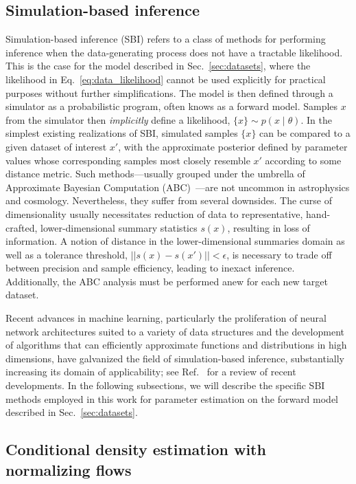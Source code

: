 \documentclass[prd,aps,10pt,nofootinbib,twocolumn,superscriptaddress,preprintnumbers,balancelastpage,longbibliography,floatfix]{revtex4-2}
\begin{document}
\subsection{Simulation-based inference}

Simulation-based inference (SBI) refers to a class of methods for performing inference when the data-generating process does not have a tractable likelihood. This is the case for the model described in Sec.~\ref{sec:datasets}, where the likelihood in Eq.~\eqref{eq:data_likelihood} cannot be used explicitly for practical purposes without further simplifications. The model is then defined through a simulator as a probabilistic program, often knows as a forward model. Samples ${x}$ from the simulator then \emph{implicitly} define a likelihood, $\{x\}\sim p(x\mid\theta)$. In the simplest existing realizations of SBI, simulated samples $\{x\}$ can be compared to a given dataset of interest $x'$, with the approximate posterior defined by parameter values whose corresponding samples most closely resemble $x'$ according to some distance metric. Such methods---usually grouped under the umbrella of Approximate Bayesian Computation (ABC)~\cite{10.1214/aos/1176346785}---are not uncommon in astrophysics and cosmology. Nevertheless, they suffer from several downsides. The curse of dimensionality usually necessitates reduction of data to representative, hand-crafted, lower-dimensional summary statistics $s(x)$, resulting in loss of information. A notion of distance in the lower-dimensional summaries domain as well as a tolerance threshold, $||s(x) - s(x')|| < \epsilon$, is necessary to trade off between precision and sample efficiency, leading to inexact inference. Additionally, the ABC analysis must be performed anew for each new target dataset.

Recent advances in machine learning, particularly the proliferation of neural network architectures suited to a variety of data structures and the development of algorithms that can efficiently approximate functions and distributions in high dimensions, have galvanized the field of simulation-based inference, substantially increasing its domain of applicability; see Ref.~\cite{Cranmer:2019eaq} for a review of recent developments. In the following subsections, we will describe the specific SBI methods employed in this work for parameter estimation on the forward model described in Sec.~\ref{sec:datasets}.

\subsection{Conditional density estimation with normalizing flows}
\end{document}
